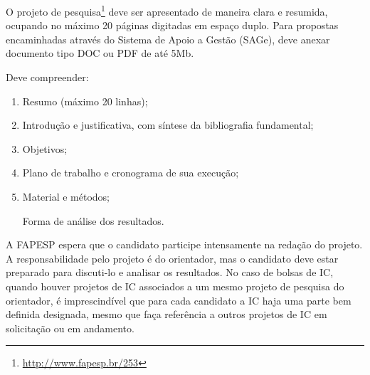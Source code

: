 \documentclass[tesedr]{eesc}
\begin{document}
\pretextual

\maketitle

\begin{preambulo}
	
O projeto de pesquisa\footnote{\url{http://www.fapesp.br/253}} deve ser apresentado de maneira clara e resumida, ocupando no máximo 20 páginas digitadas em espaço duplo. Para propostas encaminhadas através do Sistema de Apoio a Gestão (SAGe), deve anexar documento tipo DOC ou PDF de até 5Mb.

\noindent Deve compreender:


\begin{enumerate}

\item Resumo (máximo 20 linhas);

\item Introdução e justificativa, com síntese da bibliografia fundamental;

\item Objetivos;

\item Plano de trabalho e cronograma de sua execução;

\item Material e métodos;

Forma de análise dos resultados.
\end{enumerate}

A FAPESP espera que o candidato participe intensamente na redação do projeto. A responsabilidade pelo projeto é do orientador, mas o candidato deve estar preparado para discuti-lo e analisar os resultados. No caso de bolsas de IC, quando houver projetos de IC associados a um mesmo projeto de pesquisa do orientador, é imprescindível que para cada candidato a IC haja uma parte bem definida designada, mesmo que faça referência a outros projetos de IC em solicitação ou em andamento. 

\end{preambulo}
\end{document}
